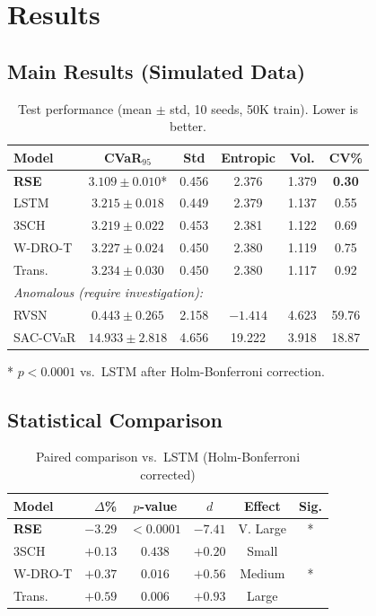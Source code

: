\documentclass[11pt]{article}
\begin{document}
\section{Results}
\label{sec:results}

\subsection{Main Results (Simulated Data)}

\begin{table}[t]
\centering
\caption{Test performance (mean $\pm$ std, 10 seeds, 50K train). Lower is better.}
\label{tab:main}
\small
\begin{tabular}{lccccc}
\toprule
\textbf{Model} & \textbf{CVaR$_{95}$} & \textbf{Std} & \textbf{Entropic} & \textbf{Vol.} & \textbf{CV\%} \\
\midrule
\textbf{RSE} & $\mathbf{3.109 \pm 0.010}$* & 0.456 & 2.376 & 1.379 & \textbf{0.30} \\
LSTM & $3.215 \pm 0.018$ & 0.449 & 2.379 & 1.137 & 0.55 \\
3SCH & $3.219 \pm 0.022$ & 0.453 & 2.381 & 1.122 & 0.69 \\
W-DRO-T & $3.227 \pm 0.024$ & 0.450 & 2.380 & 1.119 & 0.75 \\
Trans. & $3.234 \pm 0.030$ & 0.450 & 2.380 & 1.117 & 0.92 \\
\midrule
\multicolumn{6}{l}{\textit{Anomalous (require investigation):}} \\
RVSN & $0.443 \pm 0.265$ & 2.158 & $-1.414$ & 4.623 & 59.76 \\
SAC-CVaR & $14.933 \pm 2.818$ & 4.656 & 19.222 & 3.918 & 18.87 \\
\bottomrule
\end{tabular}
\footnotesize{* $p < 0.0001$ vs.\ LSTM after Holm-Bonferroni correction.}
\end{table}

\subsection{Statistical Comparison}

\begin{table}[t]
\centering
\caption{Paired comparison vs.\ LSTM (Holm-Bonferroni corrected)}
\label{tab:stats}
\small
\begin{tabular}{lrcccc}
\toprule
\textbf{Model} & \textbf{$\Delta$\%} & \textbf{$p$-value} & \textbf{$d$} & \textbf{Effect} & \textbf{Sig.} \\
\midrule
\textbf{RSE} & $-3.29$ & $<0.0001$ & $-7.41$ & V. Large & * \\
3SCH & $+0.13$ & $0.438$ & $+0.20$ & Small & \\
W-DRO-T & $+0.37$ & $0.016$ & $+0.56$ & Medium & * \\
Trans. & $+0.59$ & $0.006$ & $+0.93$ & Large & \\
\bottomrule
\end{tabular}
\end{table}
\end{document}
